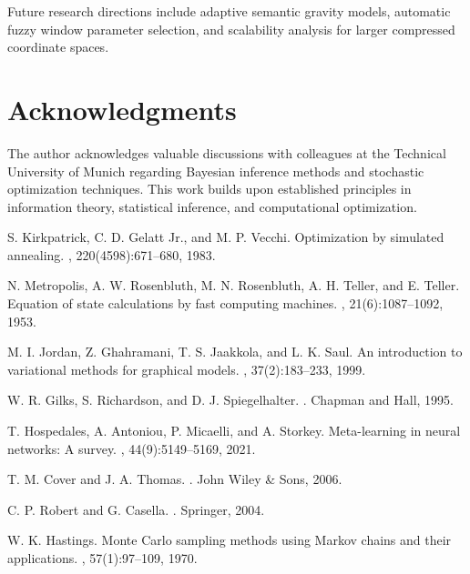 \documentclass[12pt,a4paper]{article}
\begin{document}
\begin{table}[h]
Future research directions include adaptive semantic gravity models, automatic fuzzy window parameter selection, and scalability analysis for larger compressed coordinate spaces.

\section*{Acknowledgments}

The author acknowledges valuable discussions with colleagues at the Technical University of Munich regarding Bayesian inference methods and stochastic optimization techniques. This work builds upon established principles in information theory, statistical inference, and computational optimization.


\begin{thebibliography}{99}

S. Kirkpatrick, C. D. Gelatt Jr., and M. P. Vecchi.
\newblock Optimization by simulated annealing.
, 220(4598):671--680, 1983.

N. Metropolis, A. W. Rosenbluth, M. N. Rosenbluth, A. H. Teller, and E. Teller.
\newblock Equation of state calculations by fast computing machines.
, 21(6):1087--1092, 1953.

M. I. Jordan, Z. Ghahramani, T. S. Jaakkola, and L. K. Saul.
\newblock An introduction to variational methods for graphical models.
, 37(2):183--233, 1999.

W. R. Gilks, S. Richardson, and D. J. Spiegelhalter.
.
\newblock Chapman and Hall, 1995.

T. Hospedales, A. Antoniou, P. Micaelli, and A. Storkey.
\newblock Meta-learning in neural networks: A survey.
, 44(9):5149--5169, 2021.

T. M. Cover and J. A. Thomas.
.
\newblock John Wiley \& Sons, 2006.

C. P. Robert and G. Casella.
.
\newblock Springer, 2004.

W. K. Hastings.
\newblock Monte Carlo sampling methods using Markov chains and their applications.
, 57(1):97--109, 1970.


\end{thebibliography}
\end{table}
\end{document}
